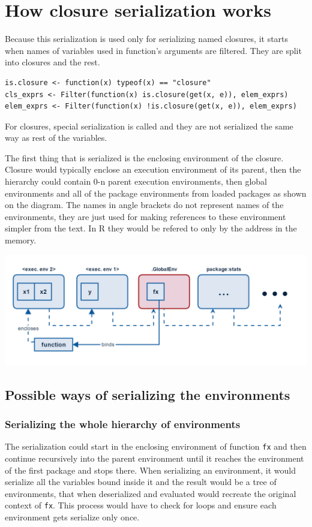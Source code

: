 \documentclass[thesis=B,english]{FITthesis}[2012/10/20]
\begin{document}
\section{How closure serialization works}
Because this serialization is used only for serializing named closures, it starts when names of variables used in function’s arguments are filtered. They are split into closures and the rest.

\begin{verbatim}
is.closure <- function(x) typeof(x) == "closure"
cls_exprs <- Filter(function(x) is.closure(get(x, e)), elem_exprs)
elem_exprs <- Filter(function(x) !is.closure(get(x, e)), elem_exprs)
\end{verbatim}

For closures, special serialization is called and they are not serialized the same way as rest of the variables. 

The first thing that is serialized is the enclosing environment of the closure. Closure would typically enclose an execution environment of its parent, then the hierarchy could contain 0-n parent execution environments, then global environments and all of the package environments from loaded packages as shown on the diagram. The names in angle brackets do not represent names of the environments, they are just used for making references to these environment simpler from the text. In R they would be refered to only by the address in the memory. 

\includegraphics[width=\textwidth]{img/func-exec.png}

\subsection{Possible ways of serializing the environments}

\subsubsection{Serializing the whole hierarchy of environments}
The serialization could start in the enclosing environment of function \verb|fx| and then continue recursively into the parent environment until it reaches the environment of the first package and stops there. When serializing an environment, it would serialize all the variables bound inside it and the result would be a tree of environments, that when deserialized and evaluated would recreate the original context of \verb|fx|. This process would have to check for loops and ensure each environment gets serialize only once.
\end{document}
